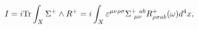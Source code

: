 \begin{equation}
I=i{\rm Tr}\int_X \Sigma^+\wedge R^+=i \int_X \varepsilon ^{\mu \nu \rho \sigma }
\Sigma_{\ \mu \nu }^{+ \ ab}R_{\rho \sigma ab}^{+}(\omega )d^4x,\label{accion}
\end{equation}


